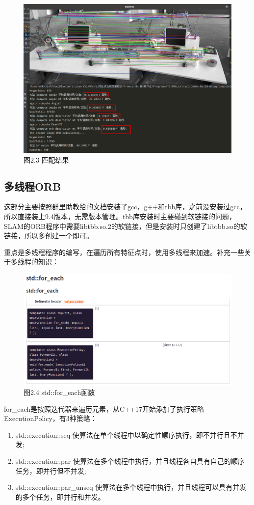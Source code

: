 \documentclass[40pt,a4paper，UTF8]{ctexart}
\numberwithin{equation}{section}
\begin{document}
\begin{figure}[H]
\centering
\includegraphics[width=4.8in]{ch5_2_3.png} {图2.3 匹配结果}
\end{figure}


\subsection{多线程ORB}
这部分主要按照群里助教给的文档安装了gcc，g++和tbb库，之前没安装过gcc，所以直接装上9.4版本，无需版本管理。tbb库安装时主要碰到软链接的问题，SLAM的ORB程序中需要libtbb.so.2的软链接，但是安装时只创建了libtbb.so的软链接，所以多创建一个即可。

重点是多线程程序的编写，在遍历所有特征点时，使用多线程来加速。补充一些关于多线程的知识\cite{ref2}：
\begin{figure}[H]
\centering
\includegraphics[width=4.8in]{ch5_2_4.png} {图2.4 std::for\_each函数}
\end{figure}

for\_each是按照迭代器来遍历元素，从C++17开始添加了执行策略ExecutionPolicy，有3种策略：
\begin{enumerate}
\item std::execution::seq  使算法在单个线程中以确定性顺序执行，即不并行且不并发;
\item std::execution::par  使算法在多个线程中执行，并且线程各自具有自己的顺序任务，即并行但不并发;
\item std::execution::par\_unseq  使算法在多个线程中执行，并且线程可以具有并发的多个任务，即并行和并发。
\end{enumerate}
\end{document}
